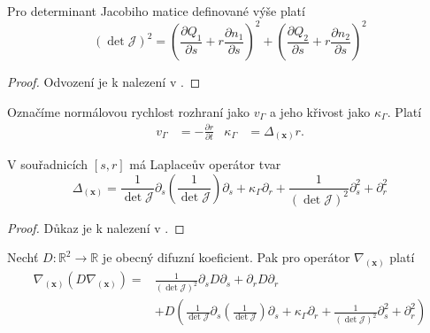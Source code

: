 \begin{lemma}\label{Vnitřní rozvoj: lemma det J na druhou}
    Pro determinant Jacobiho matice definované výše platí
    \begin{equation}
        \left(\det \mathcal{J}\right)^2 = \left( \frac{\partial Q_1}{\partial s} + r \frac{\partial n_1}{\partial s}\right)^2 + \left( \frac{\partial Q_2}{\partial s} + r \frac{\partial n_2}{\partial s}\right)^2
    \end{equation}
\end{lemma}
\begin{proof}
    Odvození je k nalezení v \cite{Dvořák_2010}.
\end{proof}

Označíme normálovou rychlost rozhraní jako \(v_\Gamma\) a jeho křivost jako \(\kappa_\Gamma\).
Platí
\begin{align}\label{Vnitřní rozvoj: Normálová rychlost rozhraní a křivost}
    v_\Gamma &= -\frac{\partial r}{\partial t} &
    \kappa_\Gamma &= \Delta_{(\mathbf{x})} r.
\end{align}
\begin{tvrzeni}\label{Vnitřní rozvoj: Laplace v nových souřadnicích}
    V souřadnicích \([s, r]\) má Laplaceův operátor tvar
    \begin{equation}
        \Delta_{(\mathbf{x})}=\frac{1}{\det \mathcal{J}} \partial_s \left(\frac{1}{\det \mathcal{J}}\right) \partial_s + \kappa_\Gamma \partial_r + \frac{1}{\left(\det \mathcal{J}\right)^2}\partial_s^2 + \partial_r^2
    \end{equation}
\end{tvrzeni}
\begin{proof}
    Důkaz je k nalezení v \cite{Dvořák_2010}.
\end{proof}
\begin{tvrzeni}\label{Vnitřní rozvoj: div D grad v nových souřadnicích}
    Nechť \(D: \mathbb{R}^2 \to \mathbb{R}\) je obecný difuzní koeficient.
    Pak pro operátor \(\nabla_{(\mathbf{x})}\) platí
    \begin{equation}
        \begin{split}
            \nabla_{(\mathbf{x})}\left(D\nabla_{(\mathbf{x})}\right) =& \frac{1}{(\det \mathcal{J})^2}\partial_s D\partial_s + \partial_r D \partial_r\\ &+ D\left( \frac{1}{\det \mathcal{J}} \partial_s \left(\frac{1}{\det \mathcal{J}}\right) \partial_s + \kappa_\Gamma \partial_r + \frac{1}{\left(\det \mathcal{J}\right)^2}\partial_s^2 + \partial_r^2 \right)
        \end{split}
    \end{equation}
\end{tvrzeni}
